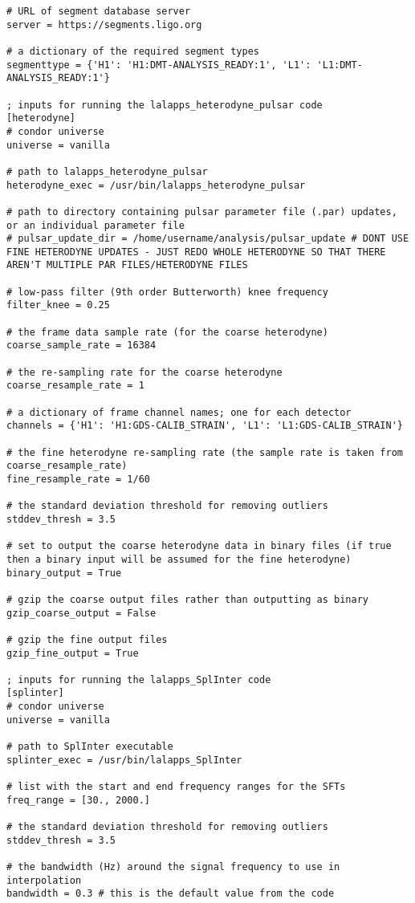 \begin{lstlisting}[frame=single]
# URL of segment database server
server = https://segments.ligo.org

# a dictionary of the required segment types
segmenttype = {'H1': 'H1:DMT-ANALYSIS_READY:1', 'L1': 'L1:DMT-ANALYSIS_READY:1'}

; inputs for running the lalapps_heterodyne_pulsar code
[heterodyne]
# condor universe
universe = vanilla

# path to lalapps_heterodyne_pulsar
heterodyne_exec = /usr/bin/lalapps_heterodyne_pulsar

# path to directory containing pulsar parameter file (.par) updates, or an individual parameter file
# pulsar_update_dir = /home/username/analysis/pulsar_update # DONT USE FINE HETERODYNE UPDATES - JUST REDO WHOLE HETERODYNE SO THAT THERE AREN'T MULTIPLE PAR FILES/HETERODYNE FILES

# low-pass filter (9th order Butterworth) knee frequency
filter_knee = 0.25

# the frame data sample rate (for the coarse heterodyne)
coarse_sample_rate = 16384

# the re-sampling rate for the coarse heterodyne
coarse_resample_rate = 1

# a dictionary of frame channel names; one for each detector
channels = {'H1': 'H1:GDS-CALIB_STRAIN', 'L1': 'L1:GDS-CALIB_STRAIN'}

# the fine heterodyne re-sampling rate (the sample rate is taken from coarse_resample_rate)
fine_resample_rate = 1/60

# the standard deviation threshold for removing outliers
stddev_thresh = 3.5

# set to output the coarse heterodyne data in binary files (if true then a binary input will be assumed for the fine heterodyne)
binary_output = True

# gzip the coarse output files rather than outputting as binary
gzip_coarse_output = False

# gzip the fine output files
gzip_fine_output = True

; inputs for running the lalapps_SplInter code
[splinter]
# condor universe
universe = vanilla

# path to SplInter executable
splinter_exec = /usr/bin/lalapps_SplInter

# list with the start and end frequency ranges for the SFTs
freq_range = [30., 2000.]

# the standard deviation threshold for removing outliers
stddev_thresh = 3.5

# the bandwidth (Hz) around the signal frequency to use in interpolation
bandwidth = 0.3 # this is the default value from the code


\end{lstlisting}
